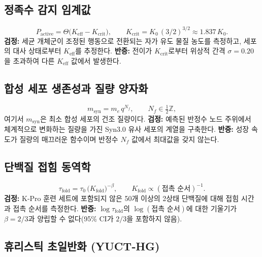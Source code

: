 \documentclass[11pt,a4paper]{article}
\begin{document}
	\subsection{정족수 감지 임계값}
	
	\begin{equation}\label{eq:pred-qs}
		P_{\mathrm{active}} =
		\Theta\!\bigl(K_{\mathrm{eff}} - K_{\mathrm{crit}}\bigr),\qquad
		K_{\mathrm{crit}} = K_0\,(3/2)^{3/2} \approx 1.837\,K_0 .
	\end{equation}
	\textbf{검정:} 세균 개체군이 조정된 행동으로 전환되는 자가 유도 물질 농도를 측정하고, 세포의 대사 상태로부터 \(K_{\mathrm{eff}}\)를 추정한다.
	\textbf{반증:} 전이가 \(K_{\mathrm{crit}}\)로부터 위상적 간격 \(\sigma=0.20\)을 초과하여 다른 \(K_{\mathrm{eff}}\) 값에서 발생한다.
	
	\subsection{합성 세포 생존성과 질량 양자화}
	
	\begin{equation}\label{eq:pred-syn}
		m_{\mathrm{syn}} = m_e\,q^{N_f},\qquad N_f\in\tfrac12\mathbb{Z},
	\end{equation}
	여기서 \(m_{\mathrm{syn}}\)은 최소 합성 세포의 건조 질량이다.
	\textbf{검정:} 예측된 반정수 노드 주위에서 체계적으로 변화하는 질량을 가진 Syn3.0 유사 세포의 계열을 구축한다.
	\textbf{반증:} 성장 속도가 질량의 매끄러운 함수이며 반정수 \(N_f\) 값에서 최대값을 갖지 않는다.
	
	\subsection{단백질 접힘 동역학}
	
	\begin{equation}\label{eq:pred-fold}
		\tau_{\mathrm{fold}} = \tau_0\,
		\bigl(K_{\mathrm{fold}}\bigr)^{-\beta},\qquad
		K_{\mathrm{fold}} \propto (\text{접촉 순서})^{-1}.
	\end{equation}
	\textbf{검정:} K‑Pro 훈련 세트에 포함되지 않은 50개 이상의 2상태 단백질에 대해 접힘 시간과 접촉 순서를 측정한다.
	\textbf{반증:} \(\log\tau_{\mathrm{fold}}\)의 \(\log(\text{접촉 순서})\)에 대한 기울기가 \(\beta=2/3\)과 양립할 수 없다(95\% CI가 \(2/3\)을 포함하지 않음).
	
	\subsection{휴리스틱 초일반화 (YUCT‑HG)}
	
\end{document}
